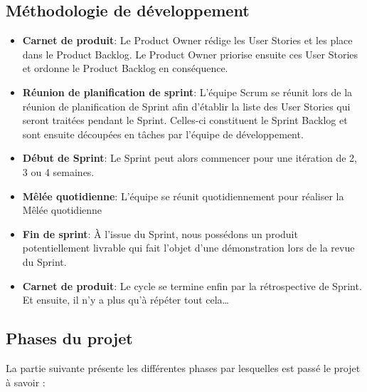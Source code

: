 \subsection{Méthodologie de développement}

\begin{itemize}
  \item \textbf{Carnet de produit}: 
        Le Product Owner rédige les User Stories et les place dans le Product Backlog.
        Le Product Owner priorise ensuite ces User Stories et ordonne le Product
        Backlog en conséquence.
    \\
    \item \textbf{Réunion de planification de sprint}: 
        L’équipe Scrum se réunit lors de la réunion de planification de Sprint afin
        d’établir la liste des User Stories qui seront traitées pendant le Sprint. Celles-ci
        constituent le Sprint Backlog et sont ensuite découpées en tâches par l’équipe
        de développement.
    \\    
    \item \textbf{Début de Sprint}: 
        Le Sprint peut alors commencer pour une itération de 2, 3 ou 4 semaines.
    \\    
    \item \textbf{Mêlée quotidienne}: 
        L’équipe se réunit quotidiennement pour réaliser la Mêlée quotidienne
    \\    
    \item \textbf{Fin de sprint}: 
        À l’issue du Sprint, nous possédons un produit potentiellement livrable qui fait l’objet d’une démonstration lors de la revue du Sprint.
    \\    
    \item \textbf{Carnet de produit}: 
        Le cycle se termine enfin par la rétrospective de Sprint. Et ensuite, il n’y a plus qu’à répéter tout cela…
\end{itemize}

\subsection{Phases du projet}

La partie suivante présente les différentes phases par lesquelles est passé le projet à savoir :
\\

